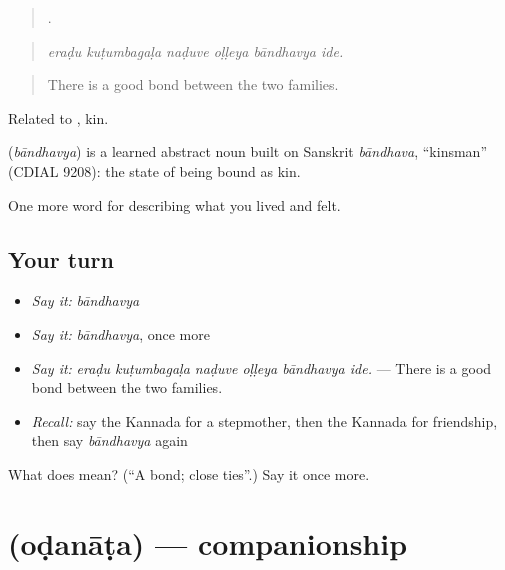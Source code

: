 \begin{quote}
     .
\end{quote}

\begin{quote}
\emph{eraḍu kuṭumbagaḷa naḍuve oḷḷeya bāndhavya ide.}
\end{quote}

\begin{quote}
There is a good bond between the two families.
\end{quote}

Related to , kin.

\begin{cousinweb}
\textbf{} (\emph{bāndhavya}) is a learned abstract noun built on Sanskrit \emph{bāndhava}, \textquotedblleft{}kinsman\textquotedblright{} (CDIAL 9208): the state of being bound as kin.
\end{cousinweb}

\begin{grammarlens}[title={What you've built}]
One more word for describing what you lived and felt.
\end{grammarlens}

\subsection*{Your turn}
\begin{itemize}
\raggedright
  \item \emph{Say it:} \emph{bāndhavya}
  \item \emph{Say it:} \emph{bāndhavya}, once more
  \item \emph{Say it:} \emph{eraḍu kuṭumbagaḷa naḍuve oḷḷeya bāndhavya ide.} — There is a good bond between the two families.
  \item \emph{Recall:} say the Kannada for a stepmother, then the Kannada for friendship, then say \emph{bāndhavya} again
\end{itemize}

\begin{tcolorbox}[breakable,colback=teal!4,colframe=teal!35!black,title={Before you move on}]
What does  mean? (\textquotedblleft{}A bond; close ties\textquotedblright{}.) Say it once more.
\end{tcolorbox}
\section[\texorpdfstring{\kn{ಒಡನಾಟ} (oḍanāṭa)}{ಒಡನಾಟ (oḍanāṭa)}]{ (oḍanāṭa) — companionship}

